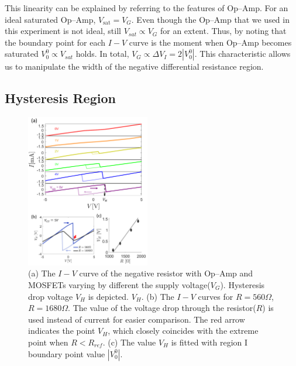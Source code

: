 \documentclass[%
 aip,
amsmath,amssymb,
reprint,
]{revtex4-1}
\begin{document}
This linearity can be explained by referring to the features of Op--Amp.
For an ideal saturated Op--Amp, $V_{\text{sat}} = V_G$. Even though the Op--Amp that we used in this experiment is not ideal, still $V_{sat} \propto V_G$ for an extent. Thus, by noting that the boundary point for each $I-V$ curve is the moment when Op--Amp becomes saturated $V_0^0\propto V_{sat}$ holds. In total, $V_G \propto \Delta V_I = 2|V_0^0|$. This characteristic allows us to manipulate the width of the negative differential resistance region.


\subsection{Hysteresis Region}
\begin{figure}[!h]
  \includegraphics[width=0.48\textwidth]{figures/Fig4.png}
  \caption{(a) The $I-V$ curve of the negative resistor with Op--Amp and MOSFETs varying by different the supply voltage($V_{G}$). Hysteresis drop voltage $V_H$ is depicted. $V_H$. (b) The $I-V$ curves for $R = 560\Omega$, $R = 1680\Omega$. The value of the voltage drop through the resistor($R$) is used instead of current for easier comparison. The red arrow indicates the point $V_H$, which closely coincides with the extreme point when $R<R_{ref}$. (c) The value $V_H$ is fitted with region I boundary point value $|V_0^0|$.}
  \label{fig:Fig4}
\end{figure}
\end{document}
